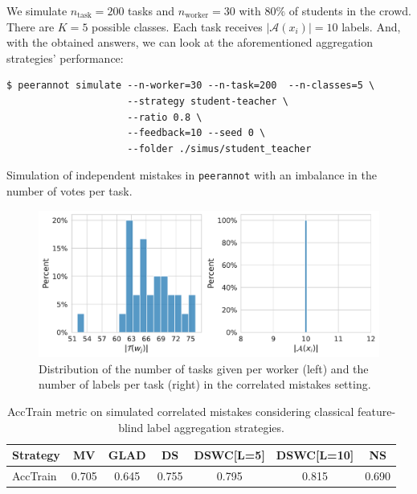 We simulate $n_{\text{task}}=200$ tasks and $n_{\text{worker}}=30$ with $80\%$ of students in the crowd. There are $K=5$ possible classes. Each task receives $\vert\mathcal{A}(x_i)\vert=10$ labels. And, with the obtained answers, we can look at the aforementioned aggregation strategies' performance:


\begin{listing}[H]
    \begin{verbatim}
$ peerannot simulate --n-worker=30 --n-task=200  --n-classes=5 \
                     --strategy student-teacher \
                     --ratio 0.8 \
                     --feedback=10 --seed 0 \
                     --folder ./simus/student_teacher
    \end{verbatim}
    \caption{Simulation of independent mistakes in \texttt{peerannot} with an imbalance in the number of votes per task.}
    \label{lst:corr_mistakes}
\end{listing}

\begin{figure}[tbh]
    \centering
    \includegraphics[width=\textwidth]{./images_peerannot/fig-simu3-output-1.pdf}
    \caption{Distribution of the number of tasks given per worker (left) and the number of labels per task (right) in the correlated mistakes setting. }
    \label{fig:desc_correlated_mistakes}
\end{figure}

\begin{table}[htbp]
    \centering
    \caption{AccTrain metric on simulated correlated mistakes considering classical feature-blind label aggregation strategies.}
    \label{tab:accuracy_train_corr}
    \begin{tabular}{|l|c|c|c|c|c|c|}
    \hline
    \textbf{Strategy} & \textbf{MV} & \textbf{GLAD} & \textbf{DS} & \textbf{DSWC[L=5]} & \textbf{DSWC[L=10]} & \textbf{NS} \\
    \hline
    AccTrain & 0.705 &	0.645 &	0.755 	&0.795 &0.815 	&0.690\\
    \hline
    \end{tabular}
    \end{table}

